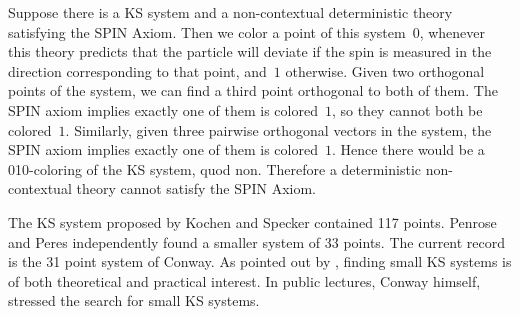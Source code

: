 \documentclass{report}
\begin{document}
{}

Suppose there is a KS system and a non-contextual deterministic theory satisfying
the SPIN Axiom.
Then we color a point of this system~$0$,
whenever this theory predicts that the particle will deviate
if the spin is measured in the direction corresponding to that
point, and~$1$ otherwise.
Given two orthogonal points of the system,
we can find a third point orthogonal to both of them.
The SPIN axiom implies exactly one of them is colored~$1$, so they
cannot both be colored~$1$.
Similarly, given three pairwise orthogonal vectors in the system,
the SPIN axiom implies exactly one of them is colored~$1$.
Hence there would be a 010-coloring of the KS system, quod non.
Therefore a deterministic non-contextual theory cannot satisfy the
SPIN Axiom.

The KS system proposed by Kochen and Specker contained 117 points\cite{ks}.
Penrose and Peres\cite{peres} independently found a smaller system of 33 points.
The current record is the 31 point system of Conway\cite[p.~197]{qtcm}.
As pointed out by \cite{c00,aow11}, finding small KS systems
is of both theoretical and practical interest.
In public lectures, Conway himself, stressed the search for small KS
systems.\cite{OC}
\end{document}
